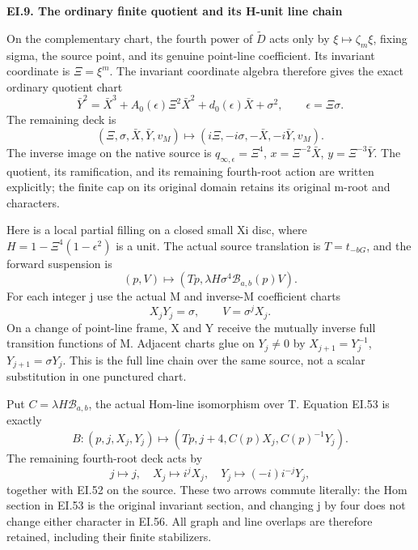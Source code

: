 \par

\medskip\noindent\textbf{EI.9. The ordinary finite quotient and its H-unit line chain}

\par\nobreak

On the complementary chart, the fourth power of
\(\widetilde D\) acts only by
\(\xi\mapsto\zeta_m\xi\), fixing sigma, the source point,
and its genuine point-line coefficient. Its invariant coordinate
is \(\Xi=\xi^m\). The invariant coordinate algebra therefore
gives the exact ordinary quotient chart
\[
 \bar Y^2=\bar X^3+A_0(\epsilon)\Xi^2\bar X^2
                 +d_0(\epsilon)\bar X+\sigma^2,
 \qquad \epsilon=\Xi\sigma.
 \tag{EI.51}
\]
The remaining deck is
\[
 (\Xi,\sigma,\bar X,\bar Y,v_M)
 \longmapsto(i\Xi,-i\sigma,-\bar X,-i\bar Y,v_M).
 \tag{EI.52}
\]
The inverse image on the native source is
\(q_{\infty,\epsilon}=\Xi^4\),
\(x=\Xi^{-2}\bar X\), \(y=\Xi^{-3}\bar Y\).
The quotient, its ramification, and its remaining fourth-root
action are written explicitly; the finite cap on its original
domain retains its original m-root and characters.

Here is a local partial filling on a closed small Xi disc, where
\(H=1-\Xi^4(1-\epsilon^2)\) is a unit. The actual source
translation is \(T=t_{-bG}\), and the forward suspension is
\[
 (p,V)\longmapsto
 (Tp,\lambda H\sigma^4\mathcal B_{a,b}(p)V).
 \tag{EI.53}
\]
For each integer j use the actual M and inverse-M coefficient
charts
\[
 X_jY_j=\sigma,\qquad V=\sigma^jX_j.
 \tag{EI.54}
\]
On a change of point-line frame, X and Y receive the mutually
inverse full transition functions of M. Adjacent charts glue
on \(Y_j\ne0\) by
\(X_{j+1}=Y_j^{-1}\), \(Y_{j+1}=\sigma Y_j\).
This is the full line chain over the same source, not a scalar
substitution in one punctured chart.

Put \(C=\lambda H\mathcal B_{a,b}\), the actual Hom-line
isomorphism over T. Equation EI.53 is exactly
\[
 B:(p,j,X_j,Y_j)\longmapsto
       (Tp,j+4,C(p)X_j,C(p)^{-1}Y_j).
 \tag{EI.55}
\]
The remaining fourth-root deck acts by
\[
 j\longmapsto j,\quad
 X_j\longmapsto i^jX_j,\quad
 Y_j\longmapsto(-i)i^{-j}Y_j,
 \tag{EI.56}
\]
together with EI.52 on the source. These two arrows commute
literally: the Hom section in EI.53 is the original invariant
section, and changing j by four does not change either
character in EI.56. All graph and line overlaps are therefore
retained, including their finite stabilizers.

